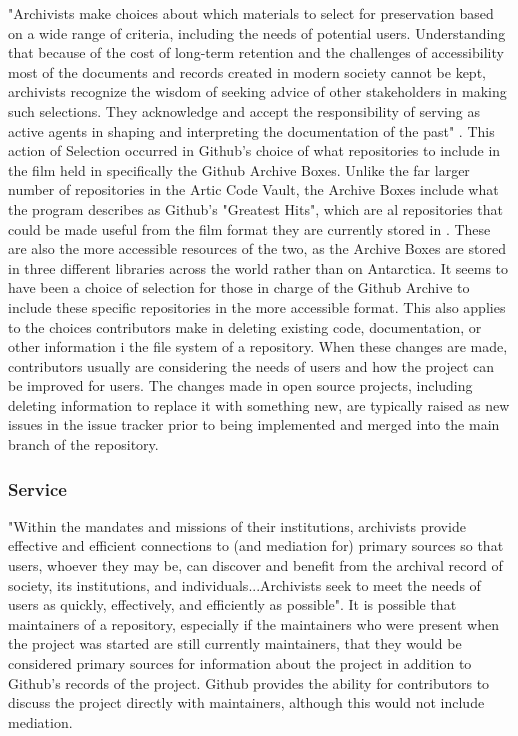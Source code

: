 "Archivists make choices about which materials to select for preservation based on a wide range of criteria, including the needs of potential users. Understanding that because of the cost of long-term retention and the challenges of accessibility most of the documents and records created in modern society cannot be kept, archivists recognize the wisdom of seeking advice of other stakeholders in making such selections. They acknowledge and accept the responsibility of serving as active agents in shaping and interpreting the documentation of the past" \cite{rubin2016foundationslis}. This action of Selection occurred in Github's choice of what repositories to include in the film held in specifically the Github Archive Boxes. Unlike the far larger number of repositories in the Artic Code Vault\cite{arcticcodevault}, the Archive Boxes include what the program describes as Github's "Greatest Hits", which are al repositories that could be made useful from the film format they are currently stored in \cite{githubarchiveboxes}. These are also the more accessible resources of the two, as the Archive Boxes are stored in three different libraries across the world rather than on Antarctica\cite{githubarchiveboxes}. It seems to have been a choice of selection for those in charge of the Github Archive to include these specific repositories in the more accessible format. This also applies to the choices contributors make in deleting existing code, documentation, or other information i the file system of a repository. When these changes are made, contributors usually are considering the needs of users and how the project can be improved for users. The changes made in open source projects, including deleting information to replace it with something new, are typically raised as new issues in the issue tracker prior to being implemented and merged into the main branch of the repository.

\subsubsection{Service}

"Within the mandates and missions of their institutions, archivists provide effective and efficient connections to (and mediation for) primary sources so that users, whoever they may be, can discover and benefit from the archival record of society, its institutions, and individuals...Archivists seek to meet the needs of users as quickly, effectively, and efficiently as possible"\cite{rubin2016foundationslis}. It is possible that maintainers of a repository, especially if the maintainers who were present when the project was started are still currently maintainers, that they would be considered primary sources for information about the project in addition to Github's records of the project. Github provides the ability for contributors to discuss the project directly with maintainers, although this would not include mediation. 


